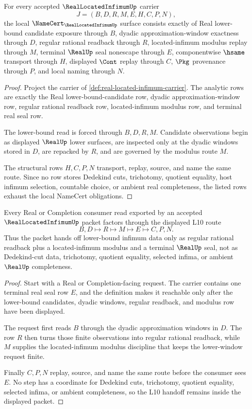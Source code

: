 \begin{theorem}
\label{thm:real-located-infimum-namecert-obligations}
For every accepted $\RealLocatedInfimumUp$ carrier
$$
J=(B,D,R,M,E,H,C,P,N),
$$
the local $\NameCert_{\RealLocatedInfimumUp}$ surface consists exactly of Real lower-bound candidate exposure through $B$, dyadic approximation-window exactness through $D$, regular rational readback through $R$, located-infimum modulus replay through $M$, terminal $\RealUp$ seal nonescape through $E$, componentwise $\hsame$ transport through $H$, displayed $\Cont$ replay through $C$, $\Pkg$ provenance through $P$, and local naming through $N$.
\end{theorem}
\begin{proof}
Project the carrier of \autoref{def:real-located-infimum-carrier}. The analytic rows are exactly the Real lower-bound-candidate row, dyadic approximation-window row, regular rational readback row, located-infimum modulus row, and terminal real seal row.

The lower-bound read is forced through $B,D,R,M$. Candidate observations begin as displayed $\RealUp$ lower surfaces, are inspected only at the dyadic windows stored in $D$, are repacked by $R$, and are governed by the modulus route $M$.

The structural rows $H,C,P,N$ transport, replay, source, and name the same route. Since no row stores Dedekind cuts, trichotomy, quotient equality, host infimum selection, countable choice, or ambient real completeness, the listed rows exhaust the local NameCert obligations.
\end{proof}

\begin{theorem}
\label{thm:real-located-infimum-l10-handoff}
Every Real or Completion consumer read exported by an accepted $\RealLocatedInfimumUp$ packet factors through the displayed L10 route
$$
B,D \longmapsto R \longmapsto M \longmapsto E \longmapsto C,P,N .
$$
Thus the packet hands off lower-bound infimum data only as regular rational readback plus a located-infimum modulus and a terminal $\RealUp$ seal, not as Dedekind-cut data, trichotomy, quotient equality, selected infima, or ambient $\RealUp$ completeness.
\end{theorem}
\begin{proof}
Start with a Real or Completion-facing request. The carrier contains one terminal real seal row $E$, and the definition makes it reachable only after the lower-bound candidates, dyadic windows, regular readback, and modulus row have been displayed.

The request first reads $B$ through the dyadic approximation windows in $D$. The row $R$ then turns those finite observations into regular rational readback, while $M$ supplies the located-infimum modulus discipline that keeps the lower-window request finite.

Finally $C,P,N$ replay, source, and name the same route before the consumer sees $E$. No step has a coordinate for Dedekind cuts, trichotomy, quotient equality, selected infima, or ambient completeness, so the L10 handoff remains inside the displayed packet.
\end{proof}

